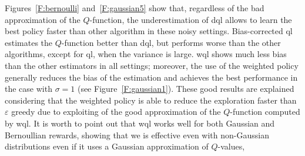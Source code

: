 Figures~\ref{F:bernoulli} and~\ref{F:gaussian5} show that, regardless of the bad approximation of the $Q$-function, the underestimation of \gls{dql} allows to learn the best policy faster than other algorithm in these noisy settings.
Bias-corrected \gls{ql} estimates the $Q$-function better than \gls{dql}, but performs worse than the other algorithms, except for \gls{ql}, when the variance is large.
\gls{wql} shows much less bias than the other estimators in all settings; moreover, the use of the weighted policy generally reduces the bias of the estimation and achieves the best performance in the case with $\sigma = 1$ (see Figure~\ref{F:gaussian1}). These good results are explained considering that the weighted policy is able to reduce the exploration faster than $\varepsilon$ greedy due to exploiting of the good approximation of the $Q$-function computed by \gls{wql}. It is worth to point out that \gls{wql} works well for both Gaussian and Bernoullian rewards, showing that \gls{we} is effective even with non-Gaussian distributions even if it uses a Gaussian approximation of $Q$-values,

